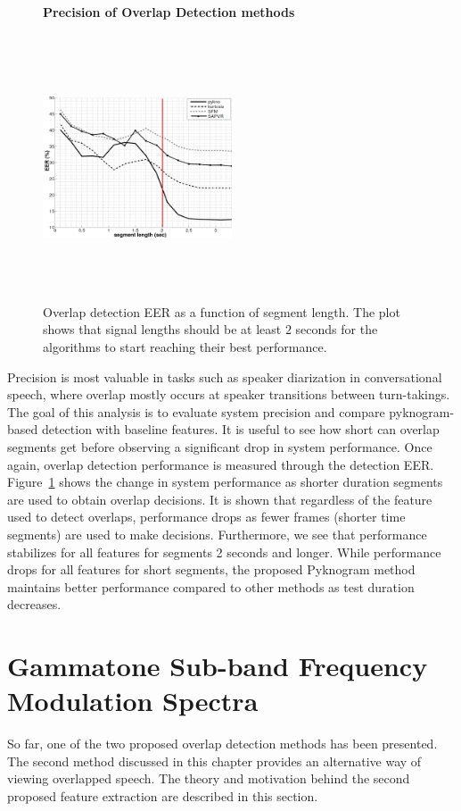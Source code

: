 {\begin{figure}[h!]
	\centering
	\hspace{-1mm}
	\textbf{Precision of Overlap Detection methods}\par\medskip
	\includegraphics[height = 3.1in, width=0.5\textwidth]{figures/eer_vs_time}
	\vspace{-1mm}
	\caption{ Overlap detection EER as a function of segment length. The plot shows that signal lengths should be at least $2$ seconds for the algorithms to start reaching their best performance.}
	\vspace{0mm}
	\label{fig:ch2_ovl_det_precision}
\end{figure}


Precision is most valuable in tasks such as speaker diarization in conversational speech, where overlap mostly occurs at speaker transitions between turn-takings. 
The goal of this analysis is to evaluate system precision and compare pyknogram-based detection with baseline features. 
It is useful to see how short can overlap segments get before observing a significant drop in system performance. 
Once again, overlap detection performance is measured through the detection EER. 
Figure~\ref{fig:ch2_ovl_det_precision} shows the change in system performance as shorter duration segments are used to obtain overlap decisions. 
It is shown that regardless of the feature used to detect overlaps, performance drops as fewer frames (shorter time segments) are used to make decisions. 
Furthermore, we see that performance stabilizes for all features for segments 2 seconds and longer. 
While performance drops for all features for short segments, the proposed Pyknogram method maintains better performance compared to other methods as test duration decreases. 


\newpage
\section{Gammatone Sub-band Frequency Modulation Spectra}
\label{sec:ch2_GSFM}
So far, one of the two proposed overlap detection methods has been presented. 
The second method discussed in this chapter provides an alternative way of viewing overlapped speech. 
The theory and motivation behind the second proposed feature extraction are described in this section. 

}
